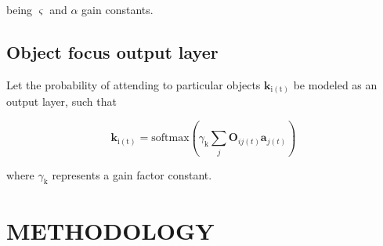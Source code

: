 \documentclass[letterpaper, 10 pt, conference]{ieeeconf}  %
\begin{document}
	\noindent being $\varsigma$ and $\alpha$ gain constants.
	
	\subsection{Object focus output layer}
	
	Let the probability of attending to particular objects $\mathbf{k}_\mathrm{i(t)}$ be modeled as an output layer, such that
	
	\begin{equation}
	\mathbf{k}_\mathrm{i(t)} = \mathrm{softmax}\left(\gamma_{\mathrm{k}}\sum_{j}^{} \mathbf{O}_{ij(t)}\mathbf{a}_{j(t)}\right)
	\label{eq:sim2-z}
	\end{equation}
	
	\noindent where $\gamma_{\mathrm{k}}$ represents a gain factor constant.
	


	

%	
%			
%	
	
	\section{METHODOLOGY}
	\label{sec:methodology}
\end{document}
